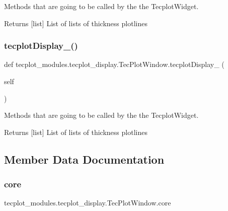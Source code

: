 Methods that are going to be called by the the Tecplot\+Widget. 

\begin{DoxyReturn}{Returns}
\mbox{[}list\mbox{]} List of lists of thickness plotlines 
\end{DoxyReturn}
\hypertarget{classtecplot__modules_1_1tecplot__display_1_1_tec_plot_window_acdc9dc387494507084a2ab2cc0c8d9ac}{}\label{classtecplot__modules_1_1tecplot__display_1_1_tec_plot_window_acdc9dc387494507084a2ab2cc0c8d9ac} 
\subsubsection{\texorpdfstring{tecplot\+Display\+\_()}{tecplotDisplay\_4()}}
{\footnotesize\ttfamily def tecplot\+\_\+modules.\+tecplot\+\_\+display.\+Tec\+Plot\+Window.\+tecplot\+Display\+\_ (\begin{DoxyParamCaption}\item[{}]{self }\end{DoxyParamCaption})}



Methods that are going to be called by the the Tecplot\+Widget. 

\begin{DoxyReturn}{Returns}
\mbox{[}list\mbox{]} List of lists of thickness plotlines 
\end{DoxyReturn}


\subsection{Member Data Documentation}
\hypertarget{classtecplot__modules_1_1tecplot__display_1_1_tec_plot_window_a7d3fabc52fc4c2d52b9aa4efea25131a}{}\label{classtecplot__modules_1_1tecplot__display_1_1_tec_plot_window_a7d3fabc52fc4c2d52b9aa4efea25131a} 
\subsubsection{\texorpdfstring{core}{core}}
{\footnotesize\ttfamily tecplot\+\_\+modules.\+tecplot\+\_\+display.\+Tec\+Plot\+Window.\+core}

